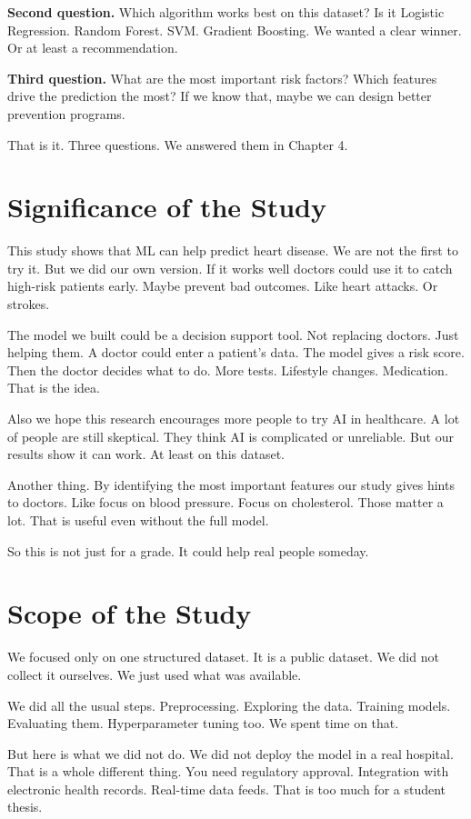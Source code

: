 \documentclass[12pt, a4paper, oneside]{book}
\begin{document}
\textbf{Second question.} Which algorithm works best on this dataset? Is it Logistic Regression. Random Forest. SVM. Gradient Boosting. We wanted a clear winner. Or at least a recommendation.

\textbf{Third question.} What are the most important risk factors? Which features drive the prediction the most? If we know that, maybe we can design better prevention programs.

That is it. Three questions. We answered them in Chapter 4.

\section{Significance of the Study}
This study shows that ML can help predict heart disease. We are not the first to try it. But we did our own version. If it works well doctors could use it to catch high-risk patients early. Maybe prevent bad outcomes. Like heart attacks. Or strokes.

The model we built could be a decision support tool. Not replacing doctors. Just helping them. A doctor could enter a patient's data. The model gives a risk score. Then the doctor decides what to do. More tests. Lifestyle changes. Medication. That is the idea.

Also we hope this research encourages more people to try AI in healthcare. A lot of people are still skeptical. They think AI is complicated or unreliable. But our results show it can work. At least on this dataset.

Another thing. By identifying the most important features our study gives hints to doctors. Like focus on blood pressure. Focus on cholesterol. Those matter a lot. That is useful even without the full model.

So this is not just for a grade. It could help real people someday.

\section{Scope of the Study}
We focused only on one structured dataset. It is a public dataset. We did not collect it ourselves. We just used what was available.

We did all the usual steps. Preprocessing. Exploring the data. Training models. Evaluating them. Hyperparameter tuning too. We spent time on that.

But here is what we did not do. We did not deploy the model in a real hospital. That is a whole different thing. You need regulatory approval. Integration with electronic health records. Real-time data feeds. That is too much for a student thesis.
\end{document}
